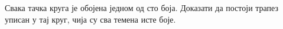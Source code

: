 \problem
Свака тачка круга је обојена једном од сто боја.
Доказати да постоји трапез уписан у тај круг, чија су сва темена исте боје.

\solution

\endproblem
